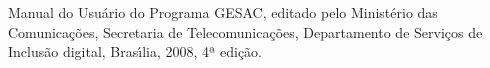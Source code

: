 \documentclass[
12pt,		%
openright,	%
twoside,  %
a4paper,			%
chapter=TITLE,		%
english,			%
french,				%
spanish,			%
brazil				%
]{USPSC-classe/USPSC}
\begin{document}
\begin{flushleft}
\begin{flushleft}
\begin{flushleft}
\begin{flushleft}
\begin{flushleft}
\begin{flushleft}
\begin{flushleft}
\begin{flushleft}
\begin{flushleft}
\begin{flushleft}
\begin{flushleft}
\begin{flushleft}
\begin{flushleft}
\begin{flushleft}
[MC, 2008] Manual do Usu\'ario do Programa GESAC, editado pelo Minist\'erio das Comunica\c{c}\~oes, Secretaria de Telecomunica\c{c}\~oes, Departamento de Servi\c{c}os de Inclus\~ao digital,  Bras\'{\i}lia, 2008, 4ª edi\c{c}\~ao.
\end{flushleft}


\end{flushleft}


\end{flushleft}


\end{flushleft}


\end{flushleft}


\end{flushleft}


\end{flushleft}


\end{flushleft}


\end{flushleft}


\end{flushleft}


\end{flushleft}


\end{flushleft}


\end{flushleft}


\end{flushleft}
\end{document}
